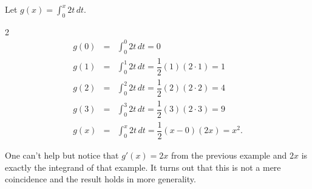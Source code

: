 \documentclass{book}
\newcommand{\dt}{\,dt}
\newcommand{\dint}{\displaystyle \int}
\begin{document}
\begin{Exam} Let $g(x) = \dint_0^x 2t\dt$.
\begin{multicols}{2}
\begin{eqnarray*}
g(0) &=& \int_0^0 2t\dt = 0\\
g(1) &=& \int_0^1 2t\dt = \dfrac{1}{2}(1)(2\cdot 1) = 1\\
g(2) &=& \int_0^2 2t\dt = \dfrac{1}{2}(2)(2\cdot 2) = 4\\
g(3) &=& \int_0^{3} 2t\dt =\dfrac{1}{2}(3)(2\cdot 3) = 9\\
g(x) &=& \int_0^{x} 2t\dt = \dfrac{1}{2}(x-0)(2x) = x^2. 
\end{eqnarray*}\vfill
\begin{center}
\end{center}
\end{multicols}
\end{Exam}

One can't help but notice that $g'(x) = 2x$ from the previous example and $2x$ is exactly the integrand of that example. It turns out that this is not a mere coincidence and the result holds in more generality.
\end{document}
